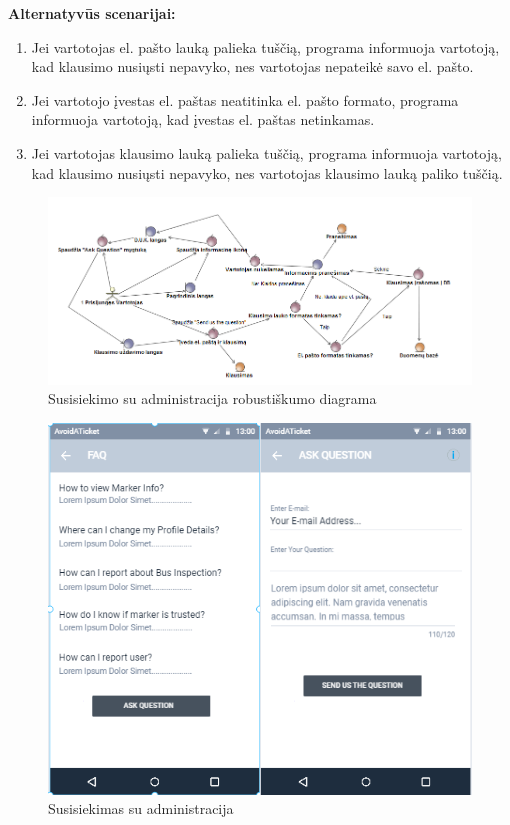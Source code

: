 \documentclass{VUMIFPSkursinis}
\begin{document}
	\textbf{Alternatyvūs scenarijai:}
	\begin{enumerate}[itemsep=-2mm]
		\item Jei vartotojas el. pašto lauką palieka tuščią, programa informuoja vartotoją, kad klausimo nusiųsti nepavyko, nes vartotojas nepateikė savo el. pašto.
		\item Jei vartotojo įvestas el. paštas neatitinka el. pašto formato, programa informuoja vartotoją, kad įvestas el. paštas netinkamas.
		\item Jei vartotojas klausimo lauką palieka tuščią, programa informuoja vartotoją, kad klausimo nusiųsti nepavyko, nes vartotojas klausimo lauką paliko tuščią.
	\end{enumerate} 
		\begin{figure}[H]
				\centering
				\includegraphics[scale=0.5]{img/Susisiekimas_su_administracija}
				\caption{Susisiekimo su administracija robustiškumo diagrama}
				\label{img:Susisiekimas su administracija RD}
			\end{figure}
	\begin{figure}[H]
				\centering
				\includegraphics[scale=1.4]{img/mockup_admincomunication}
				\caption{Susisiekimas su administracija}
				\label{img:Susisiekimas su administracija}
			\end{figure}
\end{document}
